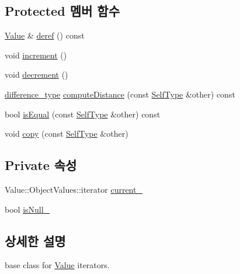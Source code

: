 \subsection*{Protected 멤버 함수}
\begin{DoxyCompactItemize}
\item 
\hyperlink{class_json_1_1_value}{Value} \& \hyperlink{class_json_1_1_value_iterator_base_aa5b75c9514a30ba2ea3c9a35c165c18e}{deref} () const
\item 
void \hyperlink{class_json_1_1_value_iterator_base_afe58f9534e1fd2033419fd9fe244551e}{increment} ()
\item 
void \hyperlink{class_json_1_1_value_iterator_base_affc8cf5ff54a9f432cc693362c153fa6}{decrement} ()
\item 
\hyperlink{class_json_1_1_value_iterator_base_a4e44bf8cbd17ec8d6e2c185904a15ebd}{difference\+\_\+type} \hyperlink{class_json_1_1_value_iterator_base_af11473c9e20d07782e42b52a2f9e4540}{compute\+Distance} (const \hyperlink{class_json_1_1_value_iterator_base_a9d2a940d03ea06d20d972f41a89149ee}{Self\+Type} \&other) const
\item 
bool \hyperlink{class_json_1_1_value_iterator_base_a010b5ad3f3337ae3732e5d7e16ca5e25}{is\+Equal} (const \hyperlink{class_json_1_1_value_iterator_base_a9d2a940d03ea06d20d972f41a89149ee}{Self\+Type} \&other) const
\item 
void \hyperlink{class_json_1_1_value_iterator_base_a496e6aba44808433ec5858c178be5719}{copy} (const \hyperlink{class_json_1_1_value_iterator_base_a9d2a940d03ea06d20d972f41a89149ee}{Self\+Type} \&other)
\end{DoxyCompactItemize}
\subsection*{Private 속성}
\begin{DoxyCompactItemize}
\item 
Value\+::\+Object\+Values\+::iterator \hyperlink{class_json_1_1_value_iterator_base_ab3138ce8af8301cca3b041ea55cb922a}{current\+\_\+}
\item 
bool \hyperlink{class_json_1_1_value_iterator_base_a3e08b114a1aed9bde518c527f94a8c59}{is\+Null\+\_\+}
\end{DoxyCompactItemize}


\subsection{상세한 설명}
base class for \hyperlink{class_json_1_1_value}{Value} iterators. 



